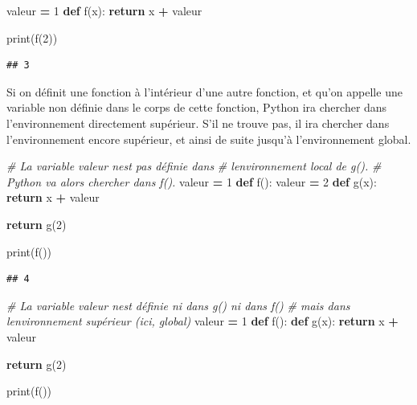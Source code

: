 \documentclass[
  12pt,
]{book}
\newenvironment{Shaded}{\begin{snugshade}}{\end{snugshade}}
\newcommand{\BuiltInTok}[1]{#1}
\newcommand{\CommentTok}[1]{\textcolor[rgb]{0.56,0.35,0.01}{\textit{#1}}}
\newcommand{\ControlFlowTok}[1]{\textcolor[rgb]{0.13,0.29,0.53}{\textbf{#1}}}
\newcommand{\DecValTok}[1]{\textcolor[rgb]{0.00,0.00,0.81}{#1}}
\newcommand{\KeywordTok}[1]{\textcolor[rgb]{0.13,0.29,0.53}{\textbf{#1}}}
\newcommand{\NormalTok}[1]{#1}
\newcommand{\OperatorTok}[1]{\textcolor[rgb]{0.81,0.36,0.00}{\textbf{#1}}}
\numberwithin{equation}{section}
\numberwithin{countremarque}{section}
\begin{document}
\begin{Shaded}
\begin{Highlighting}[]
\NormalTok{valeur }\OperatorTok{=} \DecValTok{1}
\KeywordTok{def}\NormalTok{ f(x):}
  \ControlFlowTok{return}\NormalTok{ x }\OperatorTok{+}\NormalTok{ valeur}
  
\BuiltInTok{print}\NormalTok{(f(}\DecValTok{2}\NormalTok{))}
\end{Highlighting}
\end{Shaded}

\begin{lstlisting}
## 3
\end{lstlisting}

Si on définit une fonction à l'intérieur d'une autre fonction, et qu'on appelle une variable non définie dans le corps de cette fonction, Python ira chercher dans l'environnement directement supérieur. S'il ne trouve pas, il ira chercher dans l'environnement encore supérieur, et ainsi de suite jusqu'à l'environnement global.

\begin{Shaded}
\begin{Highlighting}[]
\CommentTok{\# La variable valeur n\textquotesingle{}est pas définie dans}
\CommentTok{\# l\textquotesingle{}environnement local de g().}
\CommentTok{\# Python va alors chercher dans f().}
\NormalTok{valeur }\OperatorTok{=} \DecValTok{1}
\KeywordTok{def}\NormalTok{ f():}
\NormalTok{  valeur }\OperatorTok{=} \DecValTok{2}
  \KeywordTok{def}\NormalTok{ g(x):}
    \ControlFlowTok{return}\NormalTok{ x }\OperatorTok{+}\NormalTok{ valeur}

  \ControlFlowTok{return}\NormalTok{ g(}\DecValTok{2}\NormalTok{)}

\BuiltInTok{print}\NormalTok{(f())}
\end{Highlighting}
\end{Shaded}

\begin{lstlisting}
## 4
\end{lstlisting}

\begin{Shaded}
\begin{Highlighting}[]
\CommentTok{\# La variable valeur n\textquotesingle{}est définie ni dans g() ni dans f()}
\CommentTok{\# mais dans l\textquotesingle{}environnement supérieur (ici, global)}
\NormalTok{valeur }\OperatorTok{=} \DecValTok{1}
\KeywordTok{def}\NormalTok{ f():}
  \KeywordTok{def}\NormalTok{ g(x):}
    \ControlFlowTok{return}\NormalTok{ x }\OperatorTok{+}\NormalTok{ valeur}

  \ControlFlowTok{return}\NormalTok{ g(}\DecValTok{2}\NormalTok{)}

\BuiltInTok{print}\NormalTok{(f())}
\end{Highlighting}
\end{Shaded}
\end{document}
